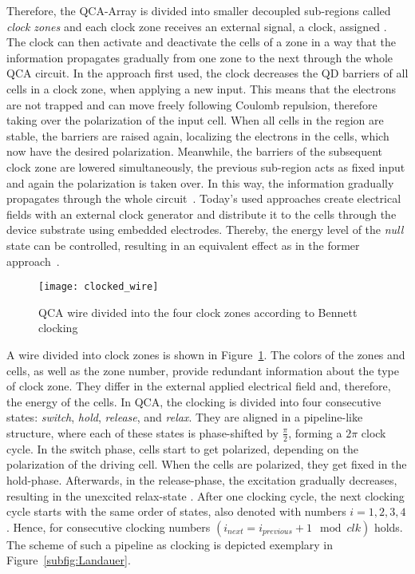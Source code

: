 Therefore, the QCA-Array is divided into smaller decoupled sub-regions called \emph{clock zones} and each clock zone receives an external signal, a clock, assigned \cite{lent1997device}. The clock can then activate and deactivate the cells of a zone in a way that the information propagates gradually from one zone to the next through the whole QCA circuit. In the approach first used, the clock decreases the QD barriers of all cells in a clock zone, when applying a new input. This means that the electrons are not trapped and can move freely following Coulomb repulsion, therefore taking over the polarization of the input cell. When all cells in the region are stable, the barriers are raised again, localizing the electrons in the cells, which now have the desired polarization. Meanwhile, the barriers of the subsequent clock zone are lowered simultaneously, the previous sub-region acts as fixed input and again the polarization is taken over. In this way, the information gradually propagates through the whole circuit~\cite{lent1997device}. Today's used approaches create electrical fields with an external clock generator and distribute it to the cells through the device substrate using embedded electrodes. Thereby, the energy level of the \textit{null} state can be controlled, resulting in an equivalent effect as in the former approach~\cite{Walter}.

\begin{figure}
	\centering
	\texttt{[image: clocked\_wire]}
	\caption{QCA wire divided into the four clock zones according to Bennett clocking}\label{fig:QCA_wire_clocked}
\end{figure}

A wire divided into clock zones is shown in Figure~\ref{fig:QCA_wire_clocked}. The colors of the zones and cells, as well as the zone number, provide redundant information about the type of clock zone. They differ in the external applied electrical field and, therefore, the energy of the cells. In QCA, the clocking is divided into four consecutive states: \emph{switch}, \emph{hold}, \emph{release}, and \emph{relax}. They are aligned in a pipeline-like structure, where each of these states is phase-shifted by $\frac{\pi}{2}$, forming a $2\pi$ clock cycle. In the switch phase, cells start to get polarized, depending on the polarization of the driving cell. When the cells are polarized, they get fixed in the hold-phase. Afterwards, in the release-phase, the excitation gradually decreases, resulting in the unexcited relax-state \cite{Sasamal2020QuantumDotCA}. After one clocking cycle, the next clocking cycle starts with the same order of states, also denoted with numbers $i = {1, 2, 3, 4}$. Hence, for consecutive clocking numbers $(i_{next} = i_{previous}+1 \mod clk)$ holds. The scheme of such a pipeline as clocking is depicted exemplary in Figure~\ref{subfig:Landauer}.

